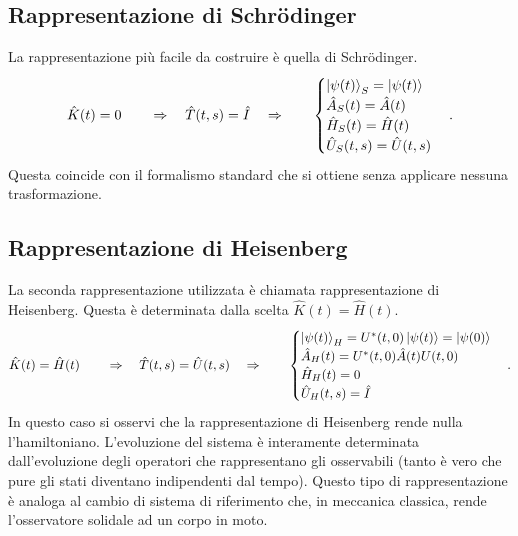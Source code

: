\subsection{Rappresentazione di Schrödinger}
La rappresentazione più facile da costruire è quella di Schrödinger. 
\begin{equation*}
    \hat K(t)=0\qquad\Rightarrow\quad\hat T(t,s) = \hat I\quad\Rightarrow\qquad
    \begin{cases}
        \ket{\psi(t)}_S=\ket{\psi(t)}\\
        \hat A_S(t)=\hat A(t)\\
        \hat H_S(t)=\hat H(t)\\
        \hat U_S(t,s)=\hat U(t,s)
    \end{cases}.
\end{equation*}
Questa coincide con il formalismo standard che si ottiene senza applicare nessuna trasformazione.
\subsection{Rappresentazione di Heisenberg}
La seconda rappresentazione utilizzata è chiamata rappresentazione di Heisenberg. Questa è determinata dalla scelta $\hat K(t)=\hat H(t)$.
\begin{equation*}
    \hat K(t)=\hat H(t)\qquad\Rightarrow\quad\hat T(t,s) = \hat U(t,s)\quad\Rightarrow\qquad
    \begin{cases}
        \ket{\psi(t)}_H=U^*(t,0)\ket{\psi(t)}=\ket{\psi(0)}\\
        \hat A_H(t)=U^*(t,0)\hat A(t)U(t,0)\\
        \hat H_H(t)=0\\
        \hat U_H(t,s)=\hat I
    \end{cases}.
\end{equation*}
In questo caso si osservi che la rappresentazione di Heisenberg rende nulla l'hamiltoniano. L'evoluzione del sistema è interamente determinata dall'evoluzione degli operatori che rappresentano gli osservabili (tanto è vero che pure gli stati diventano indipendenti dal tempo). Questo tipo di rappresentazione è analoga al cambio di sistema di riferimento che, in meccanica classica, rende l'osservatore solidale ad un corpo in moto.
